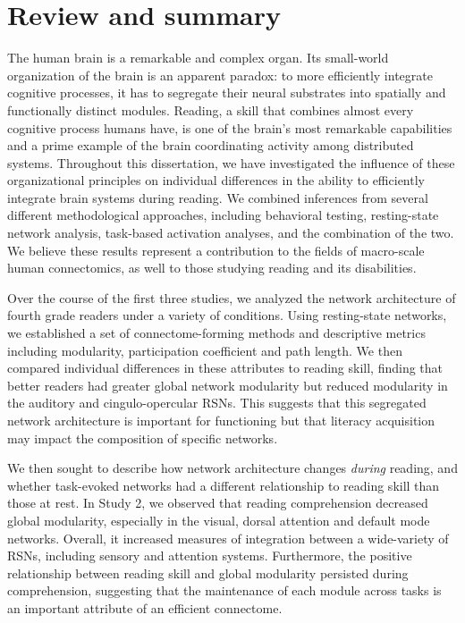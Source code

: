 \chapter{Review and summary}

The human brain is a remarkable and complex organ. Its small-world organization of the brain is an apparent paradox: to more efficiently integrate cognitive processes, it has to segregate their neural substrates into spatially and functionally distinct modules. Reading, a skill that combines almost every cognitive process humans have, is one of the brain's most remarkable capabilities and a prime example of the brain coordinating activity among distributed systems. Throughout this dissertation, we have investigated the influence of these organizational principles on individual differences in the ability to efficiently integrate brain systems during reading. We combined inferences from several different methodological approaches, including behavioral testing, resting-state network analysis, task-based activation analyses, and the combination of the two. We believe these results represent a contribution to the fields of macro-scale human connectomics, as well to those studying reading and its disabilities.

Over the course of the first three studies, we analyzed the network architecture of fourth grade readers under a variety of conditions. Using resting-state networks, we established a set of connectome-forming methods and descriptive metrics including modularity, participation coefficient and path length. We then compared individual differences in these attributes to reading skill, finding that better readers had greater global network modularity but reduced modularity in the auditory and cingulo-opercular RSNs. This suggests that this segregated network architecture is important for functioning but that literacy acquisition may impact the composition of specific networks. 

We then sought to describe how network architecture changes \textit{during} reading, and whether task-evoked networks had a different relationship to reading skill than those at rest. In Study 2, we observed that reading comprehension decreased global modularity, especially in the visual, dorsal attention and default mode networks. Overall, it increased measures of integration between a wide-variety of RSNs, including sensory and attention systems. Furthermore, the positive relationship between reading skill and global modularity persisted during comprehension, suggesting that the maintenance of each module across tasks is an important attribute of an efficient connectome. 

